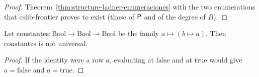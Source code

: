 \begin{proof}
  \leanok
  Theorem~\ref{thm:structure-ladner-enumeraciones} with the two enumerations that cslib-frontier proves
  to exist (those of $\mathsf{P}$ and of the degree of $B$).
\end{proof}

\begin{proposition}
  \label{prop:structure-constantes}
  \leanok
  Let $\mathrm{constantes} : \mathrm{Bool} \to \mathrm{Bool} \to \mathrm{Bool}$ be the family $a \mapsto (b
  \mapsto a)$. Then $\mathrm{constantes}$ is not universal.
  \own{}
\end{proposition}

\begin{proof}
  \leanok
  If the identity were a row $a$, evaluating at $\mathrm{false}$ and at $\mathrm{true}$ would give
  $a = \mathrm{false}$ and $a = \mathrm{true}$.
\end{proof}

